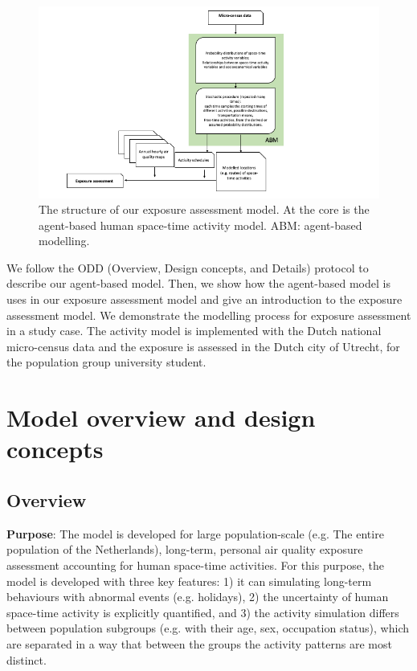 \documentclass[]{article}
\begin{document}
\begin{figure}
    \centering
    \includegraphics[width=\linewidth]{figure/exposureflow.png}
    \caption{The structure of our exposure assessment model. At the core is the agent-based human space-time activity model. ABM: agent-based modelling. }
    \label{fig:expflow}
\end{figure}



We follow the ODD (Overview, Design concepts, and Details) protocol \citep[][page 37,]{railsback2019agent} to describe our agent-based model. Then, we show how the agent-based model is uses in our exposure assessment model and give an introduction to the exposure assessment model. We demonstrate the modelling process for exposure assessment in a study case. The activity model is implemented with the Dutch national micro-census data and the exposure is assessed in the Dutch city of Utrecht, for the population group university student.  %


\section{Model overview and design concepts }
\label{sec:model}

\subsection{Overview} 

\textbf{Purpose}:
The model is developed for large population-scale (e.g. The entire population of the Netherlands), long-term, personal air quality exposure assessment accounting for human space-time activities. For this purpose, the model is developed with three key features: 1) it can simulating long-term behaviours with abnormal events (e.g. holidays), 2) the uncertainty of human space-time activity is explicitly quantified, and 3) the activity simulation differs between population subgroups (e.g. with their age, sex, occupation status), which are separated in a way that between the groups the activity patterns are most distinct. %
\end{document}
